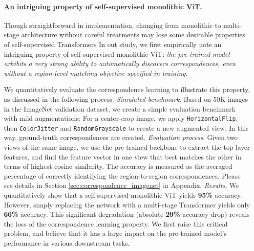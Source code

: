 \documentclass{article} \usepackage{iclr2022_conference,times}
\begin{document}
\paragraph{An intriguing property of self-supervised monolithic ViT.} 
Though straightforward in implementation, changing from monolithic to multi-stage architecture without careful treatments may lose some desirable properties of self-supervised Transformers
In out study, we first empirically note an intriguing property of self-supervised monolithic ViT\citep{caron2021emerging}: {\em the pre-trained model exhibits a very strong ability to automatically discovers correspondences, even without a region-level matching objective specified in training}. 

We quantitatively evaluate the correspondence learning to illustrate this property, as discussed in the following process.
 {\em Simulated benchmark}. Based on 50K images in the ImageNet validation dataset, we create a simple evaluation benchmark with mild augmentations: For a center-crop image, we apply \texttt{HorizontalFlip}, then \texttt{ColorJitter} and \texttt{RandomGrayscale} to create a new augmented view. In this way, ground-truth correspondences are created.
 {\em Evaluation process}. Given two views of the same image, we use the pre-trained backbone to extract the top-layer features, and find the feature vector in one view that best matches the other in terms of highest cosine similarity. The accuracy is measured as the averaged percentage of correctly identifying the region-to-region correspondences. Please see details in Section \ref{sec:correspondence_imagenet} in Appendix.
 {\em Results}.
We quantitatively show that a self-supervised monolithic ViT yields {\bf 95\%} accuracy. However, simply replacing the network with a multi-stage Transformer yields only {\bf 66\%} accuracy. This significant degradation (absolute {\bf 29\%} accuracy drop) reveals the loss of the correspondence learning property. We first raise this critical problem, and believe that it has a large impact on the pre-trained model's performance in various downstream tasks.



\vspace{-2mm}
\end{document}
